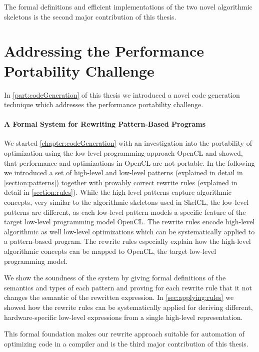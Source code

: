 \bigskip
The formal definitions and efficient \GPU implementations of the two novel algorithmic skeletons is the second major contribution of this thesis.


\section{Addressing the Performance Portability Challenge}
In \autoref{part:codeGeneration} of this thesis we introduced a novel code generation technique which addresses the performance portability challenge.

\paragraph{A Formal System for Rewriting Pattern-Based Programs}
We started \autoref{chapter:codeGeneration} with an investigation into the portability of optimization using the low-level programming approach OpenCL and showed, that performance and optimizations in OpenCL are not portable.
In the following we introduced a set of high-level and low-level patterns (explained in detail in \autoref{section:patterns}) together with provably correct rewrite rules (explained in detail in \autoref{section:rules}).
While the high-level patterns capture algorithmic concepts, very similar to the algorithmic skeletons used in SkelCL, the low-level patterns are different, as each low-level pattern models a specific feature of the target low-level programming model OpenCL.
The rewrite rules encode high-level algorithmic as well low-level optimizations which can be systematically applied to a pattern-based program.
The rewrite rules especially explain how the high-level algorithmic concepts can be mapped to OpenCL, the target low-level programming model.

We show the soundness of the system by giving formal definitions of the semantics and types of each pattern and proving for each rewrite rule that it not changes the semantic of the rewritten expression.
In \autoref{sec:applying:rules} we showed how the rewrite rules can be systematically applied for deriving different, hardware-specific low-level expressions from a single high-level representation.

\bigskip
This formal foundation makes our rewrite approach suitable for automation of optimizing code in a compiler and is the third major contribution of this thesis.

